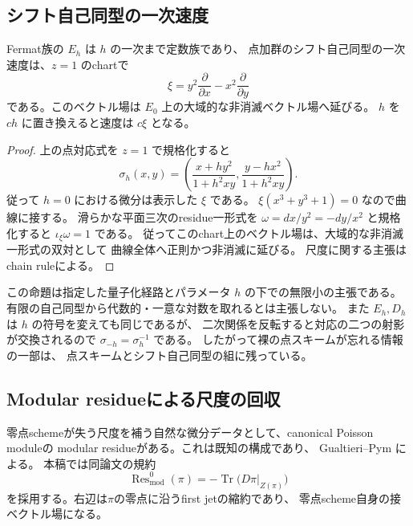 \subsection{シフト自己同型の一次速度}

\label{subsec:point-shift-first-order}

\begin{proposition}[Fermat境界に残る一次の量子尺度]
\label{prop:fermat-shift-velocity}
Fermat族の $E_h$ は $h$ の一次まで定数族であり、
点加群のシフト自己同型の一次速度は、$z=1$ のchartで
\[
 \xi=y^2\frac{\partial}{\partial x}
      -x^2\frac{\partial}{\partial y}
\]
である。このベクトル場は $E_0$ 上の大域的な非消滅ベクトル場へ延びる。
$h$ を $ch$ に置き換えると速度は $c\xi$ となる。
\end{proposition}
\begin{proof}
上の点対応式を $z=1$ で規格化すると
\[
 \sigma_h(x,y)=
 \left(\frac{x+hy^2}{1+h^2xy},
       \frac{y-hx^2}{1+h^2xy}\right).
\]
従って $h=0$ における微分は表示した $\xi$ である。
$\xi(x^3+y^3+1)=0$ なので曲線に接する。
滑らかな平面三次のresidue一形式を
$\omega=dx/y^2=-dy/x^2$ と規格化すると $\iota_\xi\omega=1$ である。
従ってこのchart上のベクトル場は、大域的な非消滅一形式の双対として
曲線全体へ正則かつ非消滅に延びる。
尺度に関する主張はchain ruleによる。
\end{proof}

\begin{remark}[有限自己同型と無限小速度]
この命題は指定した量子化経路とパラメータ $h$ の下での無限小の主張である。
有限の自己同型から代数的・一意な対数を取れるとは主張しない。
また $E_h,D_h$ は $h$ の符号を変えても同じであるが、
二次関係を反転すると対応の二つの射影が交換されるので
$\sigma_{-h}=\sigma_h^{-1}$ である。
したがって裸の点スキームが忘れる情報の一部は、
点スキームとシフト自己同型の組に残っている。
\end{remark}


\subsection{Modular residueによる尺度の回収}


零点schemeが失う尺度を補う自然な微分データとして、canonical Poisson moduleの
modular residueがある。これは既知の構成であり、
Gualtieri--Pym \cite[Definition~4.16 and Theorem~7.2]{GualtieriPym}による。
本稿では同論文の規約
\[
 \operatorname{Res}^{0}_{\mathrm{mod}}(\pi)
 =-\operatorname{Tr}\bigl(D\pi|_{Z(\pi)}\bigr)
\]
を採用する。右辺は$\pi$の零点に沿うfirst jetの縮約であり、
零点scheme自身の接ベクトル場になる。

